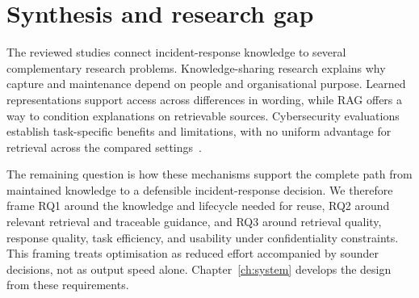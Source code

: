 \section{Synthesis and research gap}
The reviewed studies connect incident-response knowledge to several complementary research problems. Knowledge-sharing research explains why capture and maintenance depend on people and organisational purpose. Learned representations support access across differences in wording, while RAG offers a way to condition explanations on retrievable sources. Cybersecurity evaluations establish task-specific benefits and limitations, with no uniform advantage for retrieval across the compared settings~\cite{ref095,ref001,ref023,ref033}.

The remaining question is how these mechanisms support the complete path from maintained knowledge to a defensible incident-response decision. We therefore frame RQ1 around the knowledge and lifecycle needed for reuse, RQ2 around relevant retrieval and traceable guidance, and RQ3 around retrieval quality, response quality, task efficiency, and usability under confidentiality constraints. This framing treats optimisation as reduced effort accompanied by sounder decisions, not as output speed alone. Chapter~\ref{ch:system} develops the design from these requirements.
